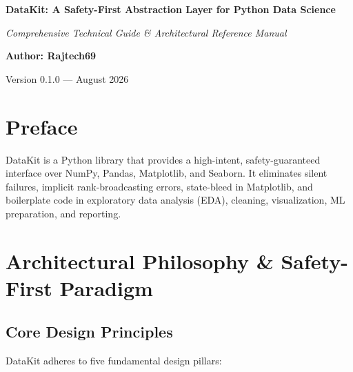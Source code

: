 \documentclass[11pt,a4paper,oneside]{book}
\begin{document}
\begin{titlepage}
    \centering
    \vspace*{2cm}
    {\Huge\bfseries\color{primary} DataKit: A Safety-First Abstraction Layer for Python Data Science\par}
    \vspace{1cm}
    {\Large\itshape Comprehensive Technical Guide \& Architectural Reference Manual\par}
    \vspace{2cm}
    {\Large\bfseries Author: Rajtech69\par}
    \vfill
    {\large Version 0.1.0 --- August 2026\par}
\end{titlepage}

\frontmatter
\chapter*{Preface}
DataKit is a Python library that provides a high-intent, safety-guaranteed interface over NumPy, Pandas, Matplotlib, and Seaborn. It eliminates silent failures, implicit rank-broadcasting errors, state-bleed in Matplotlib, and boilerplate code in exploratory data analysis (EDA), cleaning, visualization, ML preparation, and reporting.

\tableofcontents

\mainmatter

\chapter{Architectural Philosophy \& Safety-First Paradigm}

\section{Core Design Principles}
DataKit adheres to five fundamental design pillars:
\end{document}
